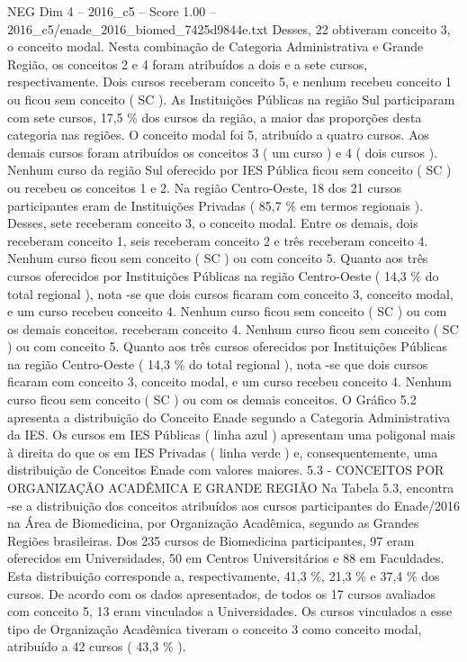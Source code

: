 \begin{textsample}{NEG Dim 4 – 2016\_c5 – Score 1.00 – 2016\_c5/enade\_2016\_biomed\_7425d9844e.txt}
Desses, 22 obtiveram conceito 3, o conceito modal.
Nesta combinação de Categoria Administrativa e Grande Região, os conceitos 2 e 4 foram atribuídos a dois e a sete cursos, respectivamente.
Dois cursos receberam conceito 5, e nenhum recebeu conceito 1 ou ficou sem conceito ( SC ).
As Instituições Públicas na região Sul participaram com sete cursos, 17,5 \% dos cursos da região, a maior das proporções desta categoria nas regiões.
O conceito modal foi 5, atribuído a quatro cursos.
Aos demais cursos foram atribuídos os conceitos 3 ( um curso ) e 4 ( dois cursos ).
Nenhum curso da região Sul oferecido por IES Pública ficou sem conceito ( SC ) ou recebeu os conceitos 1 e 2.
Na região Centro-Oeste, 18 dos 21 cursos participantes eram de Instituições Privadas ( 85,7 \% em termos regionais ).
Desses, sete receberam conceito 3, o conceito modal.
Entre os demais, dois receberam conceito 1, seis receberam conceito 2 e três receberam conceito 4.
Nenhum curso ficou sem conceito ( SC ) ou com conceito 5.
Quanto aos três cursos oferecidos por Instituições Públicas na região Centro-Oeste ( 14,3 \% do total regional ), nota -se que dois cursos ficaram com conceito 3, conceito modal, e um curso recebeu conceito 4.
Nenhum curso ficou sem conceito ( SC ) ou com os demais conceitos. receberam conceito 4.
Nenhum curso ficou sem conceito ( SC ) ou com conceito 5.
Quanto aos três cursos oferecidos por Instituições Públicas na região Centro-Oeste ( 14,3 \% do total regional ), nota -se que dois cursos ficaram com conceito 3, conceito modal, e um curso recebeu conceito 4.
Nenhum curso ficou sem conceito ( SC ) ou com os demais conceitos.
O Gráfico 5.2 apresenta a distribuição do Conceito Enade segundo a Categoria Administrativa da IES.
Os cursos em IES Públicas ( linha azul ) apresentam uma poligonal mais à direita do que os em IES Privadas ( linha verde ) e, consequentemente, uma distribuição de Conceitos Enade com valores maiores. 5.3 - CONCEITOS POR ORGANIZAÇÃO ACADÊMICA E GRANDE REGIÃO Na Tabela 5.3, encontra -se a distribuição dos conceitos atribuídos aos cursos participantes do Enade/2016 na Área de Biomedicina, por Organização Acadêmica, segundo as Grandes Regiões brasileiras.
Dos 235 cursos de Biomedicina participantes, 97 eram oferecidos em Universidades, 50 em Centros Universitários e 88 em Faculdades.
Esta distribuição corresponde a, respectivamente, 41,3 \%, 21,3 \% e 37,4 \% dos cursos.
De acordo com os dados apresentados, de todos os 17 cursos avaliados com conceito 5, 13 eram vinculados a Universidades.
Os cursos vinculados a esse tipo de Organização Acadêmica tiveram o conceito 3 como conceito modal, atribuído a 42 cursos ( 43,3 \% ).

\end{textsample}

